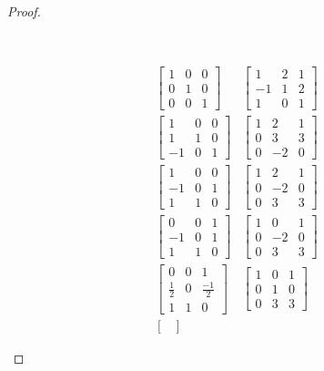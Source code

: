 \documentclass[11pt]{article}
\newenvironment{myproof}
{\begin{proof} \begin{adjustwidth}{3em}{0pt}$ $\par\nobreak\ignorespaces}
{\end{adjustwidth} \end{proof}}
\begin{document}
\begin{flushleft}
\begin{myproof}
\begin{align*}
\begin{bmatrix}
1 & 0 & 0 \\
0 & 1 & 0 \\
0 & 0 & 1
\end{bmatrix}
&\begin{bmatrix}
1 & 2 & 1 \\
-1 & 1 & 2 \\
1 & 0 & 1
\end{bmatrix} \\
\begin{bmatrix}
1 & 0 & 0 \\
1 & 1 & 0 \\
-1 & 0 & 1
\end{bmatrix}
&\begin{bmatrix}
1 & 2 & 1 \\
0 & 3 & 3 \\
0 & -2 & 0
\end{bmatrix} \\
\begin{bmatrix}
1 & 0 & 0 \\
-1 & 0 & 1 \\
1 & 1 & 0
\end{bmatrix}
&\begin{bmatrix}
1 & 2 & 1 \\
0 & -2 & 0 \\
0 & 3 & 3
\end{bmatrix} \\
\begin{bmatrix}
0 & 0 & 1 \\
-1 & 0 & 1 \\
1 & 1 & 0
\end{bmatrix}
&\begin{bmatrix}
1 & 0 & 1 \\
0 & -2 & 0 \\
0 & 3 & 3
\end{bmatrix} \\
\begin{bmatrix}
0 & 0 & 1 \\
\frac{1}{2} & 0 & \frac{-1}{2} \\
1 & 1 & 0
\end{bmatrix}
&\begin{bmatrix}
1 & 0 & 1 \\
0 & 1 & 0 \\
0 & 3 & 3
\end{bmatrix} \\
\begin{bmatrix}

\end{bmatrix}
\end{align*}
\end{myproof}
\end{flushleft}
\end{document}
